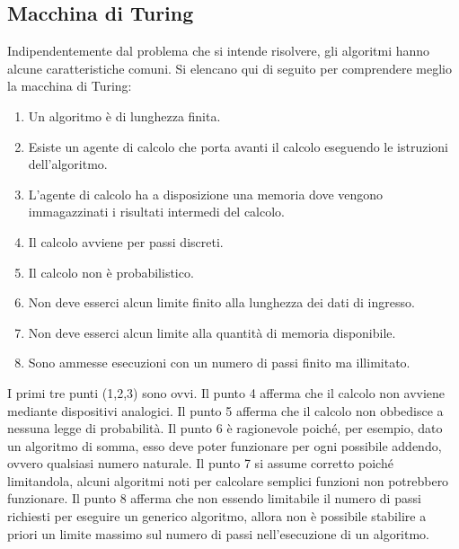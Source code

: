 \documentclass[a4paper]{article}
\begin{document}
	\subsection{Macchina di Turing}
	
	Indipendentemente dal problema che si intende risolvere, gli algoritmi hanno alcune caratteristiche comuni. Si elencano qui di seguito per comprendere meglio la macchina di Turing:
	\begin{enumerate}
		\item Un algoritmo è di lunghezza finita.
		
		\item Esiste un agente di calcolo che porta avanti il calcolo eseguendo le istruzioni dell'algoritmo.
		
		\item L'agente di calcolo ha a disposizione una memoria dove vengono immagazzinati i risultati intermedi del calcolo.
		
		\item Il calcolo avviene per passi discreti.
		
		\item Il calcolo non è probabilistico.
		
		\item Non deve esserci alcun limite finito alla lunghezza dei dati di ingresso.
		
		\item Non deve esserci alcun limite alla quantità di memoria disponibile.
		
		\item Sono ammesse esecuzioni con un numero di passi finito ma illimitato.
	\end{enumerate}
	I primi tre punti (1,2,3) sono ovvi.\newline
	Il punto 4 afferma che il calcolo non avviene mediante dispositivi analogici.\newline
	Il punto 5 afferma che il calcolo non obbedisce a nessuna legge di probabilità.\newline
	Il punto 6 è ragionevole poiché, per esempio, dato un algoritmo di somma, esso deve poter funzionare per ogni possibile addendo, ovvero qualsiasi numero naturale.\newline
	Il punto 7 si assume corretto poiché limitandola, alcuni algoritmi noti per calcolare semplici funzioni non potrebbero funzionare.\newline
	Il punto 8 afferma che non essendo limitabile il numero di passi richiesti per eseguire un generico algoritmo, allora non è possibile stabilire a priori un limite massimo sul numero di passi nell'esecuzione di un algoritmo.\newline
	
\end{document}
